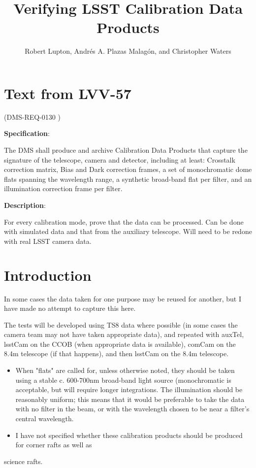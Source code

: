 \documentclass[DM,authoryear,toc,lsstdraft]{lsstdoc}
\title{Verifying LSST Calibration Data Products}
\author{%
Robert Lupton,
Andrés A. Plazas Malagón,
and
Christopher Waters
}
\date{\vcsDate}
\begin{document}

\maketitle

\renewcommand{\secRef}[1]{Sec. \ref{#1}}
\section{Text from LVV-57}

(DMS-REQ-0130 )

\textbf{Specification}:

The DMS shall produce and archive Calibration Data Products that capture the signature of the
telescope, camera and detector, including at least: Crosstalk correction matrix, Bias and Dark correction
frames, a set of monochromatic dome flats spanning the wavelength range, a synthetic broad-band flat per
filter, and an illumination correction frame per filter.

\textbf{Description}:

For every calibration mode, prove that the data can be processed. Can be done with simulated data and that
from the auxiliary telescope. Will need to be redone with real LSST camera data.

\section{Introduction}

In some cases the data taken for one purpose may be reused for another, but I have made no attempt to
capture this here.

The tests will be developed using TS8 data where possible (in some cases the camera team may not have taken
appropriate data), and repeated with auxTel, lsstCam on the CCOB (when appropriate data is available), comCam
on the 8.4m telescope (if that happens), and then lsstCam on the 8.4m telescope.

\begin{itemize}
\item When "flats" are called for, unless otherwise noted, they should be taken using a stable c. 600-700nm
broad-band light source (monochromatic is acceptable, but will require longer integrations. The illumination
should be reasonably uniform; this means that it would be preferable to take the data with no filter in the
beam, or with the wavelength chosen to be near a filter's central wavelength.

\item I have not specified whether these calibration products should be produced for corner rafts as well as
\end{itemize}
science rafts.
\end{document}
